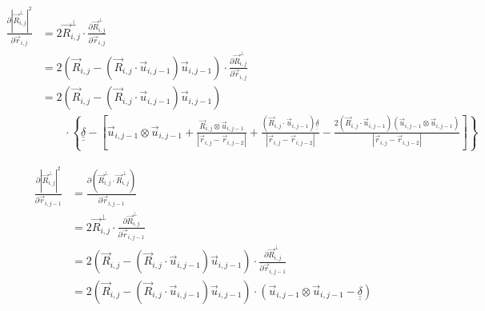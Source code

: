 \documentclass{article}
\renewcommand{\ij}{_{i,j}}
\newcommand{\ijj}{_{i,j-1}}
\newcommand{\ijjj}{_{i,j-2}}
\newcommand{\magn}[1]{\left\vert #1 \right\vert }
\renewcommand{\part}[2]{\frac{\partial #1 }{\partial #2}}
\newcommand{\ten}[1]{\underline{\underline{#1}}}
\newcommand{\rij}{\vec{r} \ij}
\newcommand{\Rij}{\vec{R} \ij}
\newcommand{\rijj}{\vec{r} \ijj}
\newcommand{\rijjj}{\vec{r} \ijjj}
\newcommand{\uijj}{\vec{u} \ijj}
\begin{document}
\begin{align*}
  \part{
    \magn{\Rij^\perp}^2
  }{ \rij }
  &= 
  2 \Rij^\perp \cdot \part{\Rij^\perp}{\rij} 
  \\
  &= 
  2
  \left(
  \vec{R} \ij 
  - 
  \left(\vec{R} \ij \cdot \vec{u} \ijj \right) 
  \vec{u} \ijj 
  \right)
  \cdot 
  \part{\Rij^\perp}{\rij}
  \\
  &= 
  2
  \left(
  \vec{R} \ij 
  - 
  \left(\vec{R} \ij \cdot \vec{u} \ijj \right) 
  \vec{u} \ijj 
  \right)
  \\
  &
  \qquad
  \cdot 
  \left\{
  \ten{\delta} 
  -
  \left[
  \uijj \otimes \uijj
  + 
  \frac{\Rij \otimes \uijj }{\magn{\rij - \rijjj}} 
  +
  \frac{ \left( 
    \Rij \cdot \uijj
    \right) \ten{\delta}}{\magn{\rij - \rijjj}}
  -
  \frac{
    2 \left(
      \Rij \cdot \uijj 
    \right)
    \left(\uijj \otimes \uijj 
    \right)
    }{\magn{\rij - \rijjj}}
  \right]
  \right\}
\end{align*}



\begin{align*}
  \part{
    \magn{\Rij^\perp}^2
  }{ \rijj }
  &=
  \part{\left(
    \Rij^\perp \cdot \Rij^\perp 
    \right)
  }{ \rijj }
  \\
  &= 
  2 \Rij^\perp \cdot \part{\Rij^\perp}{\rijj}
  \\
  &= 
  2
  \left(
  \vec{R} \ij 
  - 
  \left(\vec{R} \ij \cdot \vec{u} \ijj \right) 
  \vec{u} \ijj 
  \right)
  \cdot 
  \part{\Rij^\perp}{\rijj}
  \\
  &= 
  2
  \left(
  \vec{R} \ij 
  - 
  \left(\vec{R} \ij \cdot \vec{u} \ijj \right) 
  \vec{u} \ijj 
  \right)
  \cdot
  \left(
  \uijj \otimes \uijj 
  -
  \ten{\delta} 
  \right)
\end{align*}
\end{document}
